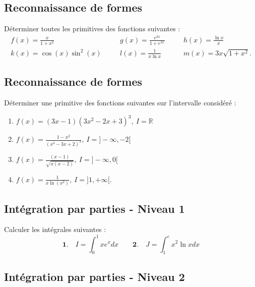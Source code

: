 

\vspace{1em}
\subsection{Reconnaissance de formes}

Déterminer toutes les primitives des fonctions suivantes : 
$$
\begin{array}{lllll}
\displaystyle f(x)=\frac{x}{1+x^2}&\quad&\displaystyle g(x)=\frac{e^{3x}}{1+e^{3x}}&\quad&
\displaystyle h(x)=\frac{\ln x}{x}\\
\displaystyle k(x)=\cos(x)\sin^2(x)&\quad&l(x)=\frac{1}{x\ln x}&\quad&m(x)=3x\sqrt{1+x^2}.
\end{array}
$$




\vspace{1em}
\subsection{Reconnaissance de formes}

Déterminer une primitive des fonctions suivantes sur l'intervalle considéré :
\begin{multicols}{2}
    \begin{enumerate}[itemsep = 0.5em]
\item $f(x)=(3x-1)(3x^2-2x+3)^3,\ I=\mathbb{R}$
\item $f(x)=\frac{1-x^2}{(x^3-3x+2)^3},\ I=]-\infty,-2[$
\item $f(x)=\frac{(x-1)}{\sqrt{x(x-2)}},\ I=]-\infty,0[$
\item $f(x)=\frac{1}{x\ln(x^2)},\ I=]1,+\infty[.$
    \end{enumerate}
\end{multicols}




\vspace{1em}
\subsection{Intégration par parties - Niveau 1}

Calculer les intégrales suivantes :
$$\mathbf{1.}\quad I=\int_0^1 xe^xdx\quad\quad\mathbf{2.}\quad J=\int_1^e x^2\ln xdx$$




\vspace{1em}
\subsection{Intégration par parties - Niveau 2}

